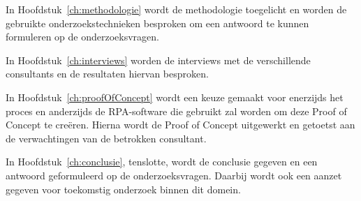 In Hoofdstuk~\ref{ch:methodologie} wordt de methodologie toegelicht en worden de gebruikte onderzoekstechnieken besproken om een antwoord te kunnen formuleren op de onderzoeksvragen.

In Hoofdstuk~\ref{ch:interviews} worden de interviews met de verschillende consultants en de resultaten hiervan besproken.

In Hoofdstuk~\ref{ch:proofOfConcept} wordt een keuze gemaakt voor enerzijds het proces en anderzijds de RPA-software die gebruikt zal worden om deze Proof of Concept te creëren. Hierna wordt de Proof of Concept uitgewerkt en getoetst aan de verwachtingen van de betrokken consultant.

In Hoofdstuk~\ref{ch:conclusie}, tenslotte, wordt de conclusie gegeven en een antwoord geformuleerd op de onderzoeksvragen. Daarbij wordt ook een aanzet gegeven voor toekomstig onderzoek binnen dit domein.